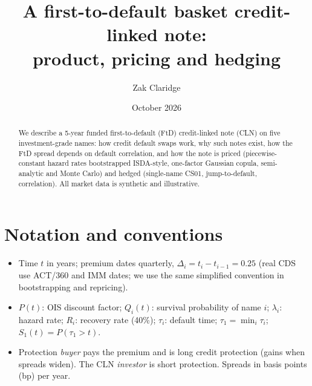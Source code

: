 \documentclass[11pt,a4paper]{article}
\title{A first-to-default basket credit-linked note:\\ product, pricing and hedging}
\author{Zak Claridge}
\date{October 2026}
\begin{document}
\maketitle
\begin{abstract}
We describe a 5-year funded first-to-default (FtD) credit-linked note (CLN) on five
investment-grade names: how credit default swaps work, why such notes exist, how the FtD spread
depends on default correlation, and how the note is priced (piecewise-constant hazard rates
bootstrapped ISDA-style, one-factor Gaussian copula, semi-analytic and Monte Carlo) and hedged
(single-name CS01, jump-to-default, correlation). All market data is synthetic and illustrative.
\end{abstract}
\tableofcontents

\section*{Notation and conventions}
\begin{itemize}[nosep]
\item Time $t$ in years; premium dates quarterly, $\Delta_i=t_i-t_{i-1}=0.25$ (real CDS use ACT/360 and
IMM dates; we use the same simplified convention in bootstrapping and repricing).
\item $P(t)$: OIS discount factor; $Q_i(t)$: survival probability of name $i$; $\lambda_i$: hazard rate;
$R_i$: recovery rate (40\%); $\tau_i$: default time; $\tau_1=\min_i\tau_i$; $S_1(t)=P(\tau_1>t)$.
\item Protection \emph{buyer} pays the premium and is long credit protection (gains when spreads widen).
The CLN \emph{investor} is short protection. Spreads in basis points (bp) per year.
\end{itemize}
\end{document}
